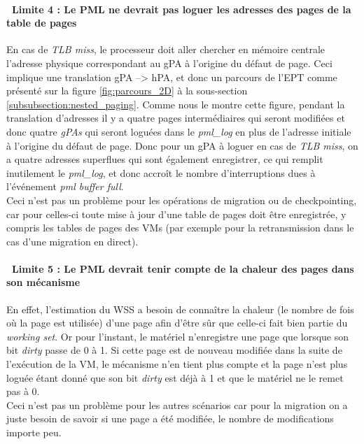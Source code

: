 \paragraph{\textbullet\ \textbf{Limite 4 : Le PML ne devrait pas loguer les adresses des pages de la table de pages}}
\par\noindent
\par\noindent En cas de \textit{TLB miss}, le processeur doit aller chercher en mémoire centrale l'adresse physique correspondant au gPA à l'origine du défaut de page. Ceci implique une translation gPA --> hPA, et donc un parcours de l'EPT comme présenté sur la figure \ref{fig:parcours_2D} à la sous-section \ref{subsubsection:nested_paging}. Comme nous le montre cette figure, pendant la translation d'adresses il y a quatre pages intermédiaires qui seront modifiées et donc quatre \textit{\acl{gPA}s} qui seront loguées dans le \textit{pml\_log} en plus de l'adresse initiale à l'origine du défaut de page. Donc pour un gPA à loguer en cas de \textit{TLB miss}, on a quatre adresses superflues qui sont également enregistrer, ce qui remplit inutilement le \textit{pml\_log}, et donc accroît le nombre d'interruptions dues à l'événement \textit{pml buffer full}.\\
Ceci n'est pas un problème pour les opérations de migration ou de checkpointing, car pour celles-ci toute mise à jour d'une table de pages doit être enregistrée, y compris les tables de pages des VMs (par exemple pour la retransmission dans le cas d'une migration en direct). 

\paragraph{\textbullet\ \textbf{Limite 5 : Le PML devrait tenir compte de la chaleur\cite{pages_chaudes} des pages dans son mécanisme}}
\par\noindent
\par\noindent En effet, l'estimation du WSS a besoin de connaître la chaleur (le nombre de fois où la page est utilisée) d'une page afin d'être sûr que celle-ci fait bien partie du \textit{working set}. Or pour l'instant, le matériel n'enregistre une page que lorsque son bit \textit{dirty} passe de 0 à 1. Si cette page est de nouveau modifiée dans la suite de l'exécution de la VM, le mécanisme n'en tient plus compte et la page n'est plus loguée étant donné que son bit \textit{dirty} est déjà à 1 et que le matériel ne le remet pas à 0.\\
Ceci n'est pas un problème pour les autres scénarios car pour la migration on a juste besoin de savoir si une page a été modifiée, le nombre de modifications importe peu.

